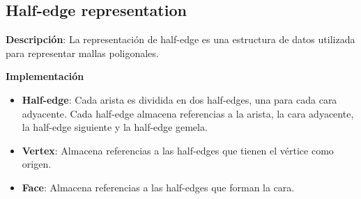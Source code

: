 \documentclass{article}
\begin{document}
\subsection{Half-edge representation}

\textbf{Descripción}: La representación de half-edge es una estructura de datos utilizada para representar mallas poligonales.

\textbf{Implementación}

\begin{itemize}
    \item \textbf{Half-edge}: Cada arista es dividida en dos half-edges, una para cada cara adyacente. Cada half-edge almacena referencias a la arista, la cara adyacente, la half-edge siguiente y la half-edge gemela.
    \item \textbf{Vertex}: Almacena referencias a las half-edges que tienen el vértice como origen.
    \item \textbf{Face}: Almacena referencias a las half-edges que forman la cara.
\end{itemize}
\end{document}
